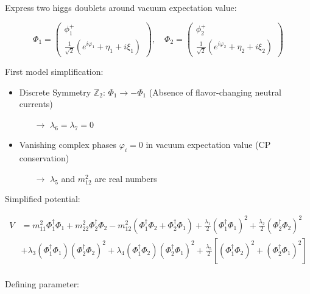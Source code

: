 \documentclass[12pt,oneside]{book}
\begin{document}
Express two higgs doublets around vacuum expectation value:

\begin{equation}
    \Phi_1 = \begin{pmatrix} \phi_1^{+} \\ \frac{1}{\sqrt{2}}(e^{i\varphi_1} + \eta_1 + i\xi_1) \end{pmatrix}, \quad \Phi_2 = \begin{pmatrix} \phi_2^{+} \\ \frac{1}{\sqrt{2}}(e^{i\varphi_2} + \eta_2 + i\xi_2) \end{pmatrix}
\end{equation}

First model simplification:

\begin{itemize}
    \item Discrete Symmetry $\mathbb{Z}_2$: $\Phi_1 \to -\Phi_1$ (Absence of flavor-changing neutral currents)

    \begin{itemize}
        \item[$\to$] $\lambda_6 = \lambda_7 = 0$
    \end{itemize}

    \item Vanishing complex phases $\varphi_i = 0$ in vacuum expectation value (CP conservation)

    \begin{itemize}
        \item[$\to$] $\lambda_5$ and $m_{12}^2$ are real numbers
    \end{itemize}
\end{itemize}

Simplified potential:

\begin{align}
    V &= m_{11}^{2}\Phi_1^{\dagger}\Phi_1 + m_{22}^{2}\Phi_2^{\dagger}\Phi_2 - m_{12}^{2}(\Phi_1^{\dagger}\Phi_2 + \Phi_2^{\dagger}\Phi_1) + \frac{\lambda_1}{2}(\Phi_1^{\dagger}\Phi_1)^2 + \frac{\lambda_2}{2}(\Phi_2^{\dagger}\Phi_2)^2 \\ \nonumber
    &+ \lambda_3(\Phi_1^{\dagger}\Phi_1)(\Phi_2^{\dagger}\Phi_2)^{2} + \lambda_4(\Phi_1^{\dagger}\Phi_2)(\Phi_2^{\dagger}\Phi_1)^{2} + \frac{\lambda_5}{2}[(\Phi_1^{\dagger}\Phi_2)^2 + (\Phi_2^{\dagger}\Phi_1)^2] \\ \nonumber
\end{align} 

Defining parameter:
\end{document}
